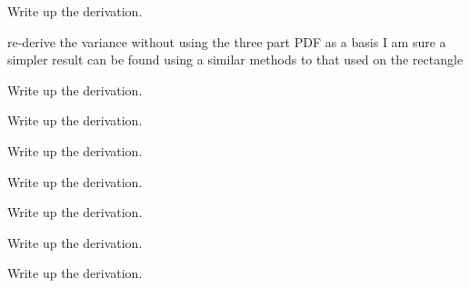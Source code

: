 \begin{DoxyRefList}
\item[\label{todo__todo000030}%
\hypertarget{todo__todo000030}{}%
Global \hyperlink{_prism_geodesic_8h_a674a98341a80a5b8589352280f89173c}{Prism\-Geodesic\-Distance\-P\-D\-F} (double t, double $\ast$parameters)]Write up the derivation.  
\item[\label{todo__todo000033}%
\hypertarget{todo__todo000033}{}%
Global \hyperlink{_prism_geodesic_8h_ac804282eeada51c4b8b2e2ae636d1bab}{Prism\-Geodesic\-Distance\-Var} (double $\ast$parameters)]re-\/derive the variance without using the three part P\-D\-F as a basis I am sure a simpler result can be found using a similar methods to that used on the rectangle  
\item[\label{todo__todo000035}%
\hypertarget{todo__todo000035}{}%
Global \hyperlink{_rectangle_8h_a1efe7711b068562816ebbe0af282f20b}{Rectangle\-Distance\-C\-D\-F} (double t, double $\ast$parameters)]Write up the derivation.  
\item[\label{todo__todo000037}%
\hypertarget{todo__todo000037}{}%
Global \hyperlink{_rectangle_manhattan_8h_adcd7815a45832662c0ba5b2733c19faa}{Rectangle\-Manhattan\-Distance\-C\-D\-F} (double t, double $\ast$parameters)]Write up the derivation.  
\item[\label{todo__todo000038}%
\hypertarget{todo__todo000038}{}%
Global \hyperlink{_rectangle_manhattan_8h_aee8e75a7c20fcd57d7e0973fe7405755}{Rectangle\-Manhattan\-Distance\-Mean} (double $\ast$parameters)]Write up the derivation.  
\item[\label{todo__todo000036}%
\hypertarget{todo__todo000036}{}%
Global \hyperlink{_rectangle_manhattan_8h_a0eb28f90684fb76ee37f6e1b63d1f54a}{Rectangle\-Manhattan\-Distance\-P\-D\-F} (double t, double $\ast$parameters)]Write up the derivation.  
\item[\label{todo__todo000039}%
\hypertarget{todo__todo000039}{}%
Global \hyperlink{_rectangle_manhattan_8h_a117ba0bca15232d5d7eb89b8b5a7c1ff}{Rectangle\-Manhattan\-Distance\-Var} (double $\ast$parameters)]Write up the derivation.  
\item[\label{todo__todo000041}%
\hypertarget{todo__todo000041}{}%
Global \hyperlink{_rectangle_max_8h_afb7f5c997bb653282b592aa729827f0f}{Rectangle\-Max\-Distance\-C\-D\-F} (double t, double $\ast$parameters)]Write up the derivation.  
\item[\label{todo__todo000042}%
\hypertarget{todo__todo000042}{}%
Global \hyperlink{_rectangle_max_8h_aac3f09b5f28e45c0862cf8eb3e9c86fc}{Rectangle\-Max\-Distance\-Mean} (double $\ast$parameters)]Write up the derivation.  

\end{DoxyRefList}
